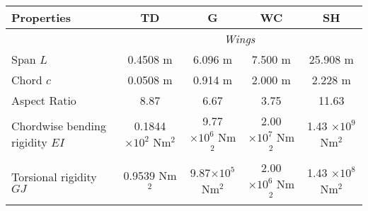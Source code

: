 \documentclass{standalone}
\begin{document}
    \centering
    \begin{tabular}{l c c c c}
    \toprule
    \toprule
    Properties&TD&G&WC&SH\\
    \midrule
    &\multicolumn{4}{c}{\textit{Wings}}\\
    Span $L$    & 0.4508 m & 6.096 m & 7.500 m & 25.908 m  \\
    Chord $c$   & 0.0508 m & 0.914 m & 2.000 m & 2.228 m \\ 
    Aspect Ratio & 8.87 & 6.67 & 3.75 & 11.63 \\
     Chordwise bending rigidity $EI$  & 0.1844 $\times 10^2$ Nm$^2$ & 9.77 $\times 10^6$ Nm$^2$ & 2.00 $\times 10^7$ Nm$^2$ & 1.43 $\times 10^9$ Nm$^2$\\
    Torsional rigidity $GJ$ & 0.9539 Nm$^2$ & 9.87$\times 10^5$ Nm$^2$ & 2.00 $\times 10^6$ Nm$^2$ & 1.43 $\times 10^8$ Nm$^2$\\
    \bottomrule
    \bottomrule
    \end{tabular}
    
\end{document}
